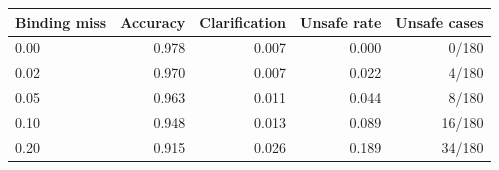 \begin{tabular}{lrrrr}
\toprule
Binding miss & Accuracy & Clarification & Unsafe rate & Unsafe cases \\
\midrule
0.00 & 0.978 & 0.007 & 0.000 & 0/180 \\
0.02 & 0.970 & 0.007 & 0.022 & 4/180 \\
0.05 & 0.963 & 0.011 & 0.044 & 8/180 \\
0.10 & 0.948 & 0.013 & 0.089 & 16/180 \\
0.20 & 0.915 & 0.026 & 0.189 & 34/180 \\
\bottomrule
\end{tabular}

